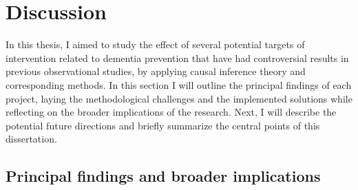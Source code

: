 \documentclass[
]{book}
\begin{document}
\hypertarget{chapter7}{%
\chapter{Discussion}\label{chapter7}}


\newpage

In this thesis, I aimed to study the effect of several potential targets of intervention related to dementia prevention that have had controversial results in previous observational studies, by applying causal inference theory and corresponding methods. In this section I will outline the principal findings of each project, laying the methodological challenges and the implemented solutions while reflecting on the broader implications of the research. Next, I will describe the potential future directions and briefly summarize the central points of this dissertation.

\hypertarget{principal-findings-and-broader-implications}{%
\section{Principal findings and broader implications}\label{principal-findings-and-broader-implications}}
\end{document}
